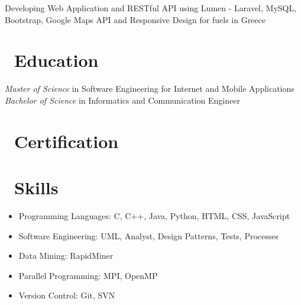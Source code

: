 \documentclass{resume}
\begin{document}
Developing Web Application and RESTful API using Lumen - Laravel, MySQL, Bootstrap, Google Maps API and Responsive Design for fuels in Greece

\section{\faGraduationCap\ Education}
\textit{Master of Science} in Software Engineering for Internet and Mobile Applications
\textit{Bachelor of Science} in Informatics and Communication Engineer

\section{\faCertificate\ Certification}


\section{\faCogs\ Skills}
\begin{itemize}[parsep=0.5ex]
  \item Programming Languages: C, C++, Java, Python, HTML, CSS, JavaScript
  \item Software Engineering: UML, Analyst, Design Patterns, Tests, Processes
  \item Data Mining: RapidMiner
  \item Parallel Programming: MPI, OpenMP
  \item Version Control: Git, SVN
\end{itemize}
\end{document}
